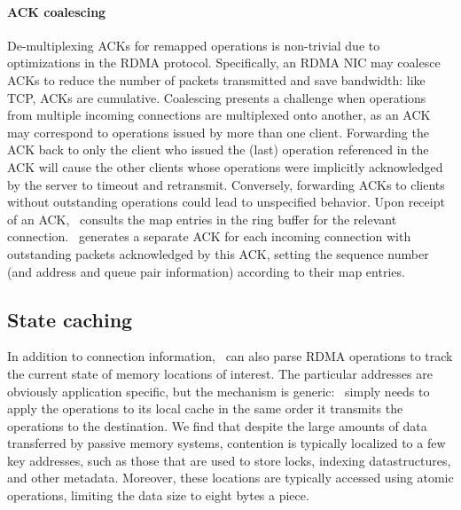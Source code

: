 \paragraph{ACK coalescing}
De-multiplexing ACKs for remapped operations is non-trivial due to
optimizations in the RDMA protocol. Specifically, an RDMA NIC may
coalesce ACKs to reduce the number of packets transmitted and save
bandwidth: like TCP, ACKs are cumulative. Coalescing presents a
challenge when operations from multiple incoming connections are
multiplexed onto another, as an ACK may correspond to operations
issued by more than one client.  Forwarding the ACK back to only the
client who issued the (last) operation referenced in the ACK will
cause the other clients whose operations were implicitly acknowledged
by the server to timeout and retransmit.  Conversely, forwarding ACKs
to clients without outstanding operations could lead to unspecified
behavior.
%
Upon receipt of an ACK, \sword\ consults the map entries in the ring
buffer for the relevant connection.  \sword\ generates a separate ACK
for each incoming connection with outstanding packets acknowledged by
this ACK, setting the sequence number (and address and queue pair
information) according to their map entries.


\subsection{State caching}

In addition to connection information, \sword\ can also parse RDMA
operations to track the current state of memory locations of interest.
The particular addresses are obviously application specific, but the
mechanism is generic: \sword\ simply needs to apply the operations to
its local cache in the same order it transmits the operations to the
destination.  We find that despite the large amounts of data
transferred by passive memory systems, contention is typically
localized to a few key addresses, such as those that are used to store
locks, indexing datastructures, and other metadata.  Moreover, these
locations are typically accessed using atomic operations, limiting
the data size to eight bytes a piece.

